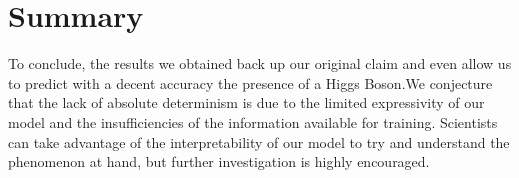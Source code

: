 \documentclass[10pt,conference,compsocconf]{IEEEtran}
\begin{document}
\section{Summary}
To conclude, the results we obtained back up our original claim and even allow us to predict with a decent accuracy the presence of a Higgs Boson.We conjecture that the lack of absolute determinism is due to the limited expressivity of our model and the insufficiencies of the information available for training. Scientists can take advantage of the interpretability of our model to try and understand the phenomenon at hand, but further investigation is highly encouraged.



\end{document}
